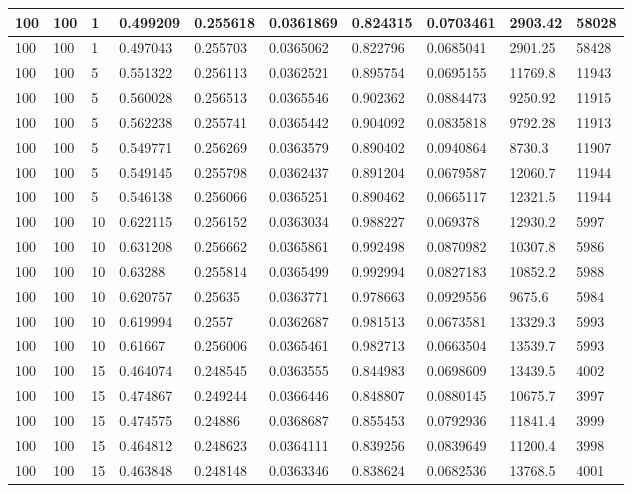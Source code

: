 \begin{landscape}
\begin{longtable}{ | l | l | l | l | l | l | l | l | l | l | }
100 & 100 & 1 & 0.499209 & 0.255618 & 0.0361869 & 0.824315 & 0.0703461 & 2903.42 & 58028\\ \hline
100 & 100 & 1 & 0.497043 & 0.255703 & 0.0365062 & 0.822796 & 0.0685041 & 2901.25 & 58428\\ \hline
100 & 100 & 5 & 0.551322 & 0.256113 & 0.0362521 & 0.895754 & 0.0695155 & 11769.8 & 11943\\ \hline
100 & 100 & 5 & 0.560028 & 0.256513 & 0.0365546 & 0.902362 & 0.0884473 & 9250.92 & 11915\\ \hline
100 & 100 & 5 & 0.562238 & 0.255741 & 0.0365442 & 0.904092 & 0.0835818 & 9792.28 & 11913\\ \hline
100 & 100 & 5 & 0.549771 & 0.256269 & 0.0363579 & 0.890402 & 0.0940864 & 8730.3 & 11907\\ \hline
100 & 100 & 5 & 0.549145 & 0.255798 & 0.0362437 & 0.891204 & 0.0679587 & 12060.7 & 11944\\ \hline
100 & 100 & 5 & 0.546138 & 0.256066 & 0.0365251 & 0.890462 & 0.0665117 & 12321.5 & 11944\\ \hline
100 & 100 & 10 & 0.622115 & 0.256152 & 0.0363034 & 0.988227 & 0.069378 & 12930.2 & 5997\\ \hline
100 & 100 & 10 & 0.631208 & 0.256662 & 0.0365861 & 0.992498 & 0.0870982 & 10307.8 & 5986\\ \hline
100 & 100 & 10 & 0.63288 & 0.255814 & 0.0365499 & 0.992994 & 0.0827183 & 10852.2 & 5988\\ \hline
100 & 100 & 10 & 0.620757 & 0.25635 & 0.0363771 & 0.978663 & 0.0929556 & 9675.6 & 5984\\ \hline
100 & 100 & 10 & 0.619994 & 0.2557 & 0.0362687 & 0.981513 & 0.0673581 & 13329.3 & 5993\\ \hline
100 & 100 & 10 & 0.61667 & 0.256006 & 0.0365461 & 0.982713 & 0.0663504 & 13539.7 & 5993\\ \hline
100 & 100 & 15 & 0.464074 & 0.248545 & 0.0363555 & 0.844983 & 0.0698609 & 13439.5 & 4002\\ \hline
100 & 100 & 15 & 0.474867 & 0.249244 & 0.0366446 & 0.848807 & 0.0880145 & 10675.7 & 3997\\ \hline
100 & 100 & 15 & 0.474575 & 0.24886 & 0.0368687 & 0.855453 & 0.0792936 & 11841.4 & 3999\\ \hline
100 & 100 & 15 & 0.464812 & 0.248623 & 0.0364111 & 0.839256 & 0.0839649 & 11200.4 & 3998\\ \hline
100 & 100 & 15 & 0.463848 & 0.248148 & 0.0363346 & 0.838624 & 0.0682536 & 13768.5 & 4001\\ \hline

\end{longtable}
\end{landscape}
